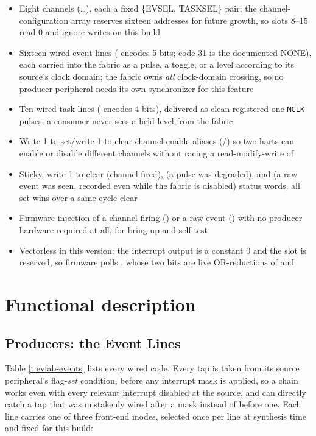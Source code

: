 \begin{itemize}
	\item Eight channels (\ldots{}), each a fixed \{EVSEL, TASKSEL\} pair; the channel-configuration array reserves sixteen addresses for future growth, so slots 8--15 read 0 and ignore writes on this build
	\item Sixteen wired event lines ( encodes 5 bits; code 31 is the documented NONE), each carried into the fabric as a pulse, a toggle, or a level according to its source's clock domain; the fabric owns \textit{all} clock-domain crossing, so no producer peripheral needs its own synchronizer for this feature
	\item Ten wired task lines ( encodes 4 bits), delivered as clean registered one-\texttt{MCLK} pulses; a consumer never sees a held level from the fabric
	\item Write-1-to-set/write-1-to-clear channel-enable aliases (/) so two harts can enable or disable different channels without racing a read-modify-write of 
	\item Sticky, write-1-to-clear  (channel fired),  (a pulse was degraded), and  (a raw event was seen, recorded even while the fabric is disabled) status words, all set-wins over a same-cycle clear
	\item Firmware injection of a channel firing () or a raw event () with no producer hardware required at all, for bring-up and self-test
	\item Vectorless in this version: the interrupt output is a constant 0 and the  slot is reserved, so firmware polls , whose two bits are live OR-reductions of  and 
\end{itemize}

\section{Functional description}

\subsection{Producers: the Event Lines}
\label{s:evfab-events}

Table \ref{t:evfab-events} lists every wired  code. Every tap is taken from its source peripheral's flag-\textit{set} condition, before any interrupt mask is applied, so a chain works even with every relevant interrupt disabled at the source, and  can directly catch a tap that was mistakenly wired after a mask instead of before one. Each line carries one of three front-end modes, selected once per line at synthesis time and fixed for this build:

